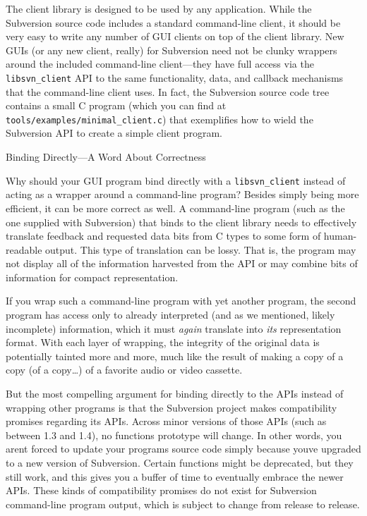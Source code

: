The client library is designed to be used by any application. While the
Subversion source code includes a standard command-line client, it
should be very easy to write any number of GUI clients on top of the
client library. New GUIs (or any new client, really) for Subversion need
not be clunky wrappers around the included command-line client---they
have full access via the \texttt{libsvn\_client} API to the same
functionality, data, and callback mechanisms that the command-line
client uses. In fact, the Subversion source code tree contains a small C
program (which you can find at
\texttt{tools/examples/minimal\_client.c}) that exemplifies how to wield
the Subversion API to create a simple client program.

Binding Directly---A Word About Correctness

Why should your GUI program bind directly with a \texttt{libsvn\_client}
instead of acting as a wrapper around a command-line program? Besides
simply being more efficient, it can be more correct as well. A
command-line program (such as the one supplied with Subversion) that
binds to the client library needs to effectively translate feedback and
requested data bits from C types to some form of human-readable output.
This type of translation can be lossy. That is, the program may not
display all of the information harvested from the API or may combine
bits of information for compact representation.

If you wrap such a command-line program with yet another program, the
second program has access only to already interpreted (and as we
mentioned, likely incomplete) information, which it must \emph{again}
translate into \emph{its} representation format. With each layer of
wrapping, the integrity of the original data is potentially tainted more
and more, much like the result of making a copy of a copy (of a
copy\ldots) of a favorite audio or video cassette.

But the most compelling argument for binding directly to the APIs
instead of wrapping other programs is that the Subversion project makes
compatibility promises regarding its APIs. Across minor versions of
those APIs (such as between 1.3 and 1.4), no function\textquotesingle s
prototype will change. In other words, you aren\textquotesingle t forced
to update your program\textquotesingle s source code simply because
you\textquotesingle ve upgraded to a new version of Subversion. Certain
functions might be deprecated, but they still work, and this gives you a
buffer of time to eventually embrace the newer APIs. These kinds of
compatibility promises do not exist for Subversion command-line program
output, which is subject to change from release to release.

